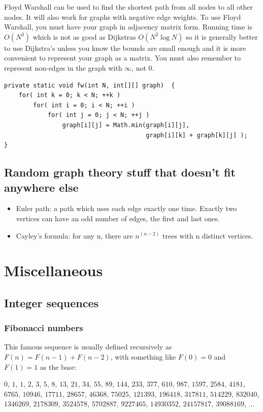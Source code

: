 \documentclass[a4paper,12pt]{article}
\begin{document}
Floyd Warshall can be used to find the shortest path from all nodes to all other nodes. It will also work for graphs with negative edge weights. To use Floyd Warshall, you must have your graph in adjacency matrix form. Running time is $O(N^3)$ which is not as good as Dijkstras $O(N^2\log N)$ so it is generally better to use Dijkstra's unless you know the bounds are small enough and it is more convenient to represent your graph as a matrix. You must also remember to represent non-edges in the graph with $\infty$, not 0.

\begin{lstlisting}
private static void fw(int N, int[][] graph)  {
	for( int k = 0; k < N; ++k )
	    for( int i = 0; i < N; ++i )
			for( int j = 0; j < N; ++j )
				graph[i][j] = Math.min(graph[i][j], 
									   graph[i][k] + graph[k][j] );
}
\end{lstlisting}

\subsection{Random graph theory stuff that doesn't fit anywhere else}
\begin{itemize}\item Euler path: a path which uses each edge exactly one time. Exactly two vertices can have an odd number of edges, the first and last ones.
\item Cayley's formula: for any n, there are $n^{(n-2)}$ trees with n distinct vertices.
\end{itemize}

\newpage\section{Miscellaneous}

\subsection{Integer sequences}
\subsubsection{Fibonacci numbers}
This famous sequence is usually defined recursively as $F(n)=F(n-1)+F(n-2)$, with something like $F(0)=0$ and $F(1)=1$ as the base:

\begin{center}$0$, $1$, $1$, $2$, $3$, $5$, $8$, $13$, $21$, $34$, $55$, $89$, $144$, $233$, $377$, $610$, $987$, $1597$, $2584$, $4181$, $6765$, $10946$, $17711$, $28657$, $46368$, $75025$, $121393$, $196418$, $317811$, $514229$, $832040$, $1346269$, $2178309$, $3524578$, $5702887$, $9227465$, $14930352$, $24157817$, $39088169$, $\ldots$\end{center}
\end{document}
